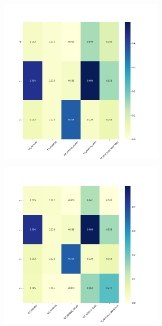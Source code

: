 \begin{figure}[H]
\begin{subfigure}{.5\textwidth}
  \centering
  \includegraphics[width=0.9\textwidth]{imagenes/case2/kmeans/heatmaps/hm_kmeans_case2_salida_k3.png}
\end{subfigure}%
\begin{subfigure}{.5\textwidth}
  \centering
  \includegraphics[width=0.9\textwidth]{imagenes/case2/kmeans/heatmaps/hm_kmeans_case2_salida_k4.png}

\end{subfigure}
\end{figure}

